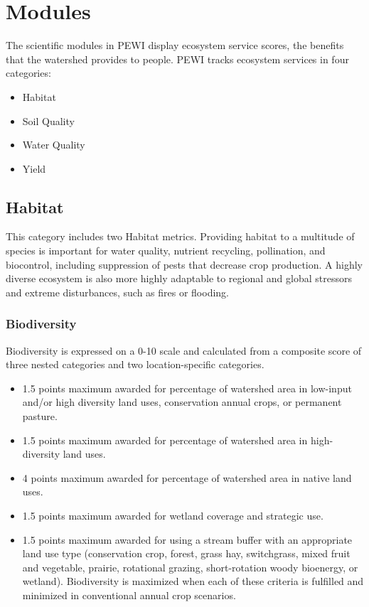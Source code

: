 \documentclass[11pt]{article}
\begin{document}
\newpage
\section{Modules}
The scientific modules in PEWI display ecosystem service scores, the benefits that the watershed provides to people. PEWI tracks ecosystem services in four categories: 
\begin{itemize}
\item Habitat
\item Soil Quality
\item Water Quality
\item Yield
\end{itemize}
\subsection{Habitat}
This category includes two Habitat metrics. Providing habitat to a multitude of species is important for water quality, nutrient recycling, pollination, and biocontrol, including suppression of pests that decrease crop production. A highly diverse ecosystem is also more highly adaptable to regional and global stressors and extreme disturbances, such as fires or flooding.

\subsubsection{Biodiversity}
Biodiversity is expressed on a 0-10 scale and calculated from a composite score of three nested categories and two location-specific categories. 
\begin{itemize}
\item 1.5 points maximum awarded for percentage of watershed area in low-input and/or high diversity land uses, conservation annual crops, or permanent pasture. 
\item 1.5 points maximum awarded for percentage of watershed area in high-diversity land uses. 
\item 4 points maximum awarded for percentage of watershed area in native land uses. 
\item 1.5 points maximum awarded for wetland coverage and strategic use. 
\item 1.5 points maximum awarded for using a stream buffer with an appropriate land use type (conservation crop, forest, grass hay, switchgrass, mixed fruit and vegetable, prairie, rotational grazing, short-rotation woody bioenergy, or wetland). Biodiversity is maximized when each of these criteria is fulfilled and minimized in conventional annual crop scenarios.
\end{itemize}
\end{document}
